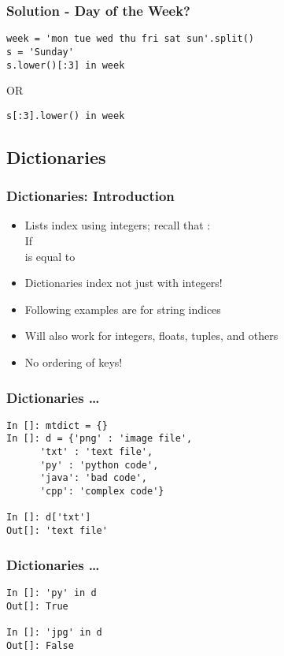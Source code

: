 \documentclass[14pt,compress]{beamer}
\begin{document}
\begin{frame}[fragile]
  \frametitle{Solution - Day of the Week?}
  \small
\begin{lstlisting}
week = 'mon tue wed thu fri sat sun'.split()
s = 'Sunday'
s.lower()[:3] in week
\end{lstlisting}
  OR
\begin{lstlisting}
s[:3].lower() in week
\end{lstlisting}
\end{frame}

\subsection{Dictionaries}

\begin{frame}[fragile]
  \frametitle{Dictionaries: Introduction}
  \begin{itemize}
  \item Lists index using integers; recall that :\\
    \vspace*{1em}
      If \\
       is equal to 
      \vspace*{2em}
    \item Dictionaries index not just with integers!
    \item Following examples are for string indices
    \item Will also work for integers, floats, tuples, and others
    \item \alert{No ordering of keys!}
  \end{itemize}
\end{frame}

\begin{frame}[fragile]
  \frametitle{Dictionaries \ldots}
\begin{lstlisting}
In []: mtdict = {}
In []: d = {'png' : 'image file',
      'txt' : 'text file',
      'py' : 'python code',
      'java': 'bad code',
      'cpp': 'complex code'}

In []: d['txt']
Out[]: 'text file'
  \end{lstlisting}
\end{frame}

\begin{frame}[fragile]
  \frametitle{Dictionaries \ldots}
  \begin{lstlisting}
In []: 'py' in d
Out[]: True

In []: 'jpg' in d
Out[]: False
  \end{lstlisting}
\end{frame}
\end{document}

